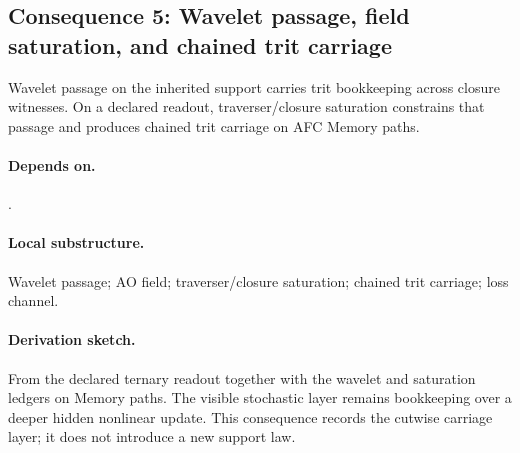 \subsection{Consequence 5: Wavelet passage, field saturation, and chained trit carriage}
\begin{consequence}\label{cons:c5}
Wavelet passage on the inherited support carries trit bookkeeping across closure witnesses. On a declared readout, traverser/closure saturation constrains that passage and produces chained trit carriage on AFC Memory paths.
\end{consequence}
\paragraph{Depends on.} .
\paragraph{Local substructure.} Wavelet passage; AO field; traverser/closure saturation; chained trit carriage; loss channel.
\paragraph{Derivation sketch.} From the declared ternary readout together with the wavelet and saturation ledgers on Memory paths. The visible stochastic layer remains bookkeeping over a deeper hidden nonlinear update. This consequence records the cutwise carriage layer; it does not introduce a new support law.

